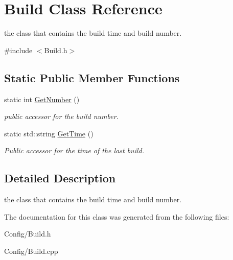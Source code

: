 \hypertarget{class_build}{\section{\-Build \-Class \-Reference}
\label{class_build}
}


the class that contains the build time and build number.  




{\ttfamily \#include $<$\-Build.\-h$>$}

\subsection*{\-Static \-Public \-Member \-Functions}
\begin{DoxyCompactItemize}
\item 
\hypertarget{class_build_a9f5d52e1840e568016036c34124da091}{static int \hyperlink{class_build_a9f5d52e1840e568016036c34124da091}{\-Get\-Number} ()}\label{class_build_a9f5d52e1840e568016036c34124da091}

\begin{DoxyCompactList}\small\item\em public accessor for the build number. \end{DoxyCompactList}\item 
\hypertarget{class_build_a129bada4f288e35d2340e157f6414c1f}{static std\-::string \hyperlink{class_build_a129bada4f288e35d2340e157f6414c1f}{\-Get\-Time} ()}\label{class_build_a129bada4f288e35d2340e157f6414c1f}

\begin{DoxyCompactList}\small\item\em \-Public accessor for the time of the last build. \end{DoxyCompactList}\end{DoxyCompactItemize}


\subsection{\-Detailed \-Description}
the class that contains the build time and build number. 

\-The documentation for this class was generated from the following files\-:\begin{DoxyCompactItemize}
\item 
\-Config/\-Build.\-h\item 
\-Config/\-Build.\-cpp\end{DoxyCompactItemize}

